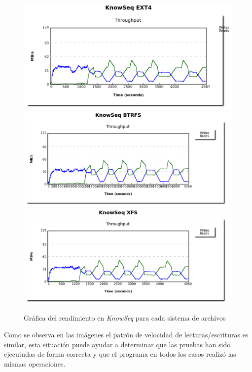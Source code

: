 \begin{figure}[H]
    \centering
    \includegraphics[scale=0.35]{doc/assets/images/Capitulo4/Knowseq/knowseq_ext4.png}
    \includegraphics[scale=0.35]{doc/assets/images/Capitulo4/Knowseq/knowseq_btrfs.png}
    \includegraphics[scale=0.35]{doc/assets/images/Capitulo4/Knowseq/knowseq_xfs.png}
    \caption{Gráfica del rendimiento en \textit{KnowSeq} para cada sistema de archivos}
    \label{fig:my_label}
\end{figure}

Como se observa en las imágenes el patrón de velocidad de lecturas/escrituras es similar, esta situación puede ayudar a determinar que las pruebas han sido ejecutadas de forma correcta y que el programa en todos los casos realizó las mismas operaciones.

